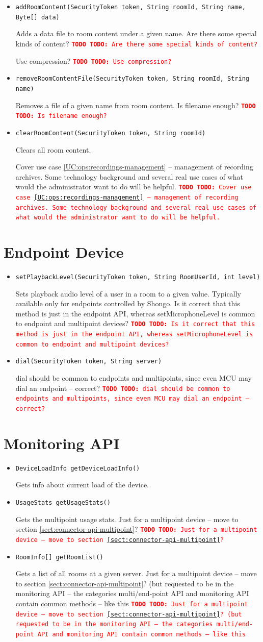 \documentclass[a4paper]{report}
\newenvironment{Api}{\begin{itemize}}{\end{itemize}}
\newcommand{\ApiCode}[1]{\lstinline[style=styleApi]|#1|}
\newcommand{\ApiItem}[1]{\item #1 %

}
\newcommand{\ApiCmd}[1]{\ApiItem{\ApiCode{#1}}}
\newcommand{\TODO}[1]{%
\def\empty{}%
\def\prvniparametr{#1}%
\ifx\prvniparametr\empty%
\begingroup\tt\textcolor{red}{\noindent\textbf{TODO}}\endgroup
\else%
\begingroup\tt\textcolor{red}{\noindent\textbf{TODO:}\ #1}\endgroup
\fi%
}
\begin{document}
\begin{Api}
\ApiCmd{addRoomContent(SecurityToken token, String roomId, String name, Byte[] data)}
Adds a data file to room content under a given name.
\TODO{Are there some special kinds of content?}
\TODO{Use compression?}

\ApiCmd{removeRoomContentFile(SecurityToken token, String roomId, String name)}
Removes a file of a given name from room content.
\TODO{Is filename enough?}

\ApiCmd{clearRoomContent(SecurityToken token, String roomId)}
Clears all room content.

\TODO{Cover use case \ref{UC:ops:recordings-management} -- management of recording archives. Some technology background and several real use cases of what would the administrator want to do will be helpful.}

\end{Api}


\section{Endpoint Device} \label{sect:connector-endpoint-api}

\begin{Api}

\ApiCmd{setPlaybackLevel(SecurityToken token, String RoomUserId, int level)}
Sets playback audio level of a user in a room to a given value. Typically available only for endpoints controlled by Shongo. \TODO{Is it correct that this method is just in the endpoint API, whereas setMicrophoneLevel is common to endpoint and multipoint devices?}

\ApiCmd{dial(SecurityToken token, String server)}
\TODO{dial should be common to endpoints and multipoints, since even MCU may dial an endpoint -- correct?}

\end{Api}


\section{Monitoring API}

\begin{Api}

\ApiCmd{DeviceLoadInfo getDeviceLoadInfo()}
Gets info about current load of the device.

\ApiCmd{UsageStats getUsageStats()}
Gets the multipoint usage stats.
\TODO{Just for a multipoint device -- move to section \ref{sect:connector-api-multipoint}?}

\ApiCmd{RoomInfo[] getRoomList()}
Gets a list of all rooms at a given server.
\TODO{Just for a multipoint device -- move to section \ref{sect:connector-api-multipoint}? (but requested to be in the monitoring API -- the categories multi/end-point API and monitoring API contain common methods -- like this}




\end{Api}
\end{document}
